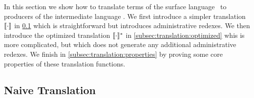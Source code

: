 In this section we show how to translate terms of the surface language \surfacelang\ to producers of the intermediate language \targetlang.
We first introduce a simpler translation $\llbracket \cdot \rrbracket$ in \cref{subsec:translation:naive} which is straightforward but introduces administrative redexes.
We then introduce the optimized translation $\llbracket \cdot \rrbracket_{}^{\ast}$ in \cref{subsec:translation:optimized} whis is more complicated, but which does not generate 
any additional administrative redexes.
We finish in \cref{subsec:translation:properties} by proving some core properties of these translation functions.

\subsection{Naive Translation}
\label{subsec:translation:naive}

